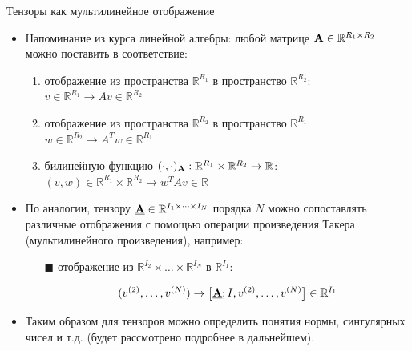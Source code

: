 \begin{frame}{Тензоры как мультилинейное отображение}
\begin{itemize}
    \item Напоминание из курса линейной алгебры: любой  матрице $\textbf{A} \in \mathbb{R}^{R_1 \times R_2}$ можно поставить в соответствие:
    \begin{enumerate}
        \item отображение из пространства $\mathbb{R}^{R_1}$ в пространство $\mathbb{R}^{R_2}$: $v \in \mathbb{R}^{R_1} \rightarrow Av \in \mathbb{R}^{R_2}$
        \item отображение из пространства $\mathbb{R}^{R_2}$ в пространство $\mathbb{R}^{R_1}$: $w \in \mathbb{R}^{R_2}\rightarrow A^Tw \in \mathbb{R}^{R_1}$
        \item билинейную функцию $(\cdot, \cdot)_{\textbf{A}}: \mathbb{R}^{R_1} \times \mathbb{R}^{R_2} \rightarrow \mathbb{R}$: $(v, w) \in \mathbb{R}^{R_1} \times \mathbb{R}^{R_2}  \rightarrow w^TAv \in \mathbb{R}$
    \end{enumerate}
    \item По аналогии, тензору $\underline{\textbf{A}} \in \mathbb{R}^{I_1 \times \dots \times I_N}$ порядка $N$ можно сопоставлять различные отображения с помощью операции произведения Такера (мультилинейного произведения), например:
    \begin{itemize}
        \item[$\blacksquare$] отображение из $\mathbb{R}^{I_2} \times \dots \times \mathbb{R}^{I_N}$ в $\mathbb{R}^{I_1}:$

        $$(v^{(2)}, \dots, v^{(N)}) \rightarrow \big[ \underline{\textbf{A}}; I, v^{(2)}, \dots, v^{(N)} \big] \in \mathbb{R}^{I_1}$$
    \end{itemize}
    \item Таким образом для тензоров можно определить понятия нормы, сингулярных чисел и т.д. (будет рассмотрено подробнее в дальнейшем).
\end{itemize}
\end{frame}
